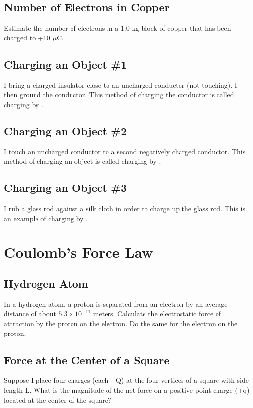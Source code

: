 \documentclass[11pt]{article}
\begin{document}
\subsection{Number of Electrons in Copper}
Estimate the number of electrons in a 1.0 kg block of copper that has been charged to +10 $\mu$C.

\subsection{Charging an Object \#1}
I bring a charged insulator close to an uncharged conductor (not touching).  I then ground the conductor.  This method of charging the conductor is called charging by \underline{\hspace{1cm}}.

\subsection{Charging an Object \#2}
I touch an uncharged conductor to a second negatively charged conductor.  This method of charging an object is called charging by \underline{\hspace{1cm}}.

\subsection{Charging an Object \#3}
I rub a glass rod against a silk cloth in order to charge up the glass rod.  This is an example of charging by \underline{\hspace{1cm}}.


\pagebreak
\section{Coulomb's Force Law}
\vspace{10pt}

\subsection{Hydrogen Atom}
In a hydrogen atom, a proton is separated from an electron by an average distance of about $5.3 \times 10^{-11}$ meters.  Calculate the electrostatic force of attraction by the proton on the electron.  Do the same for the electron on the proton.

\subsection{Force at the Center of a Square}
Suppose I place four charges (each +Q) at the four vertices of a square with side length L.  What is the magnitude of the net force on a positive point charge (+q) located at the center of the square?
\end{document}
